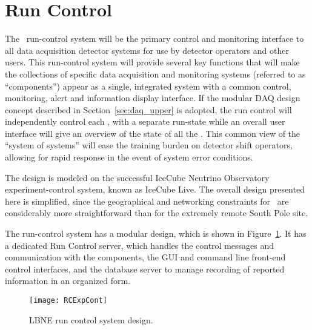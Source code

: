 \section{Run Control}
\label{sec:daq_runcontrol}

The \LBNE\ run-control system will be the primary control and
monitoring interface to all data acquisition detector systems for use
by detector operators and other users.  This run-control system will
provide several key functions that will make the collections of
specific data acquisition and monitoring systems (referred to as
``components'') appear as a single, integrated system with a common
control, monitoring, alert and information display interface.  If the
modular DAQ design concept described in Section~\ref{sec:daq_upper} is
adopted, the run control will independently control each \COMPARTMENT,
 with a separate run-state while an overall user interface will
give an overview of the state of all the \COMPARTMENTS.  This common
view of the ``system of systems'' will ease the training burden on
detector shift operators, allowing for rapid response in the event of
system error conditions.

The design is modeled on the successful IceCube Neutrino Observatory
experiment-control system, known as IceCube
Live\cite{comp:icecube-live}.  The overall design presented here is
simplified, since the geographical and networking constraints for
\LBNE\ are considerably more straightforward than for the extremely
remote South Pole site.


The run-control system has a modular design, which is shown in
Figure~\ref{fig:expcont}.  It has a dedicated Run Control server,
which handles the control messages and communication with the
components, the GUI and command line front-end control interfaces, and
the database server to manage recording of reported information in an
organized form.

\begin{figure}[htb]
  \centering
  \begin{center}
    \texttt{[image: RCExpCont]}
  \end{center}
    \caption[Run control system]{LBNE run control system design.}
  \label{fig:expcont}
\end{figure}


